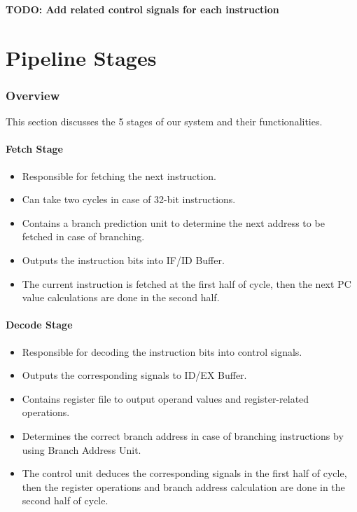 \documentclass[12pt]{report}
\begin{document}
\textbf{TODO: Add related control signals for each instruction}

\part{Pipeline Stages}

\section{Overview}
This section discusses the 5 stages of our system and their functionalities.

\subsection{Fetch Stage}
\begin{itemize}
    \item Responsible for fetching the next instruction.
    \item Can take two cycles in case of 32-bit instructions.
    \item Contains a branch prediction unit to determine the next address to be fetched in case of branching.
    \item Outputs the instruction bits into IF/ID Buffer.
    \item The current instruction is fetched at the first half of cycle, then the next PC value calculations are done in the second half.
\end{itemize}

\subsection{Decode Stage}
\begin{itemize}
    \item Responsible for decoding the instruction bits into control signals.
    \item Outputs the corresponding signals to ID/EX Buffer.
    \item Contains register file to output operand values and register-related operations.
    \item Determines the correct branch address in case of branching instructions by using Branch Address Unit.
    \item The control unit deduces the corresponding signals in the first half of cycle, then the register operations and branch address calculation are done in the second half of cycle.
\end{itemize}
\end{document}
